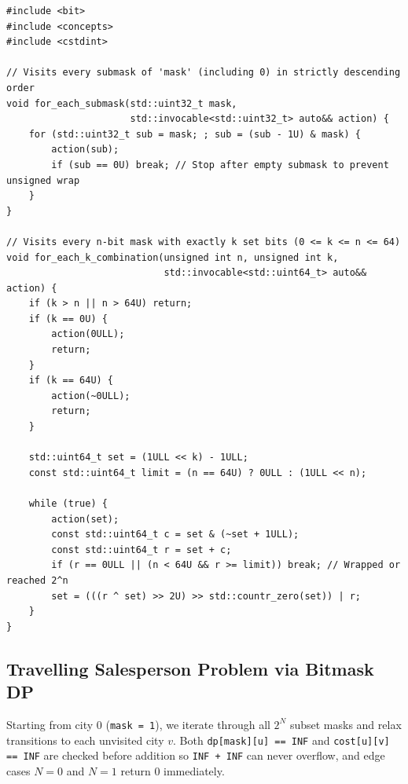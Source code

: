\documentclass[11pt,a4paper]{article}
\theoremstyle{definition}
\begin{document}
\begin{lstlisting}[caption={Zero-overhead submask enumeration and 64-bit-safe Gosper's Hack}]
#include <bit>
#include <concepts>
#include <cstdint>

// Visits every submask of 'mask' (including 0) in strictly descending order
void for_each_submask(std::uint32_t mask,
                      std::invocable<std::uint32_t> auto&& action) {
    for (std::uint32_t sub = mask; ; sub = (sub - 1U) & mask) {
        action(sub);
        if (sub == 0U) break; // Stop after empty submask to prevent unsigned wrap
    }
}

// Visits every n-bit mask with exactly k set bits (0 <= k <= n <= 64)
void for_each_k_combination(unsigned int n, unsigned int k,
                            std::invocable<std::uint64_t> auto&& action) {
    if (k > n || n > 64U) return;
    if (k == 0U) {
        action(0ULL);
        return;
    }
    if (k == 64U) {
        action(~0ULL);
        return;
    }

    std::uint64_t set = (1ULL << k) - 1ULL;
    const std::uint64_t limit = (n == 64U) ? 0ULL : (1ULL << n);

    while (true) {
        action(set);
        const std::uint64_t c = set & (~set + 1ULL);
        const std::uint64_t r = set + c;
        if (r == 0ULL || (n < 64U && r >= limit)) break; // Wrapped or reached 2^n
        set = (((r ^ set) >> 2U) >> std::countr_zero(set)) | r;
    }
}
\end{lstlisting}

\subsection{Travelling Salesperson Problem via Bitmask DP}

Starting from city $0$ (\texttt{mask = 1}), we iterate through all $2^N$ subset masks and relax transitions to each unvisited city $v$. Both \texttt{dp[mask][u] == INF} and \texttt{cost[u][v] == INF} are checked before addition so \texttt{INF + INF} can never overflow, and edge cases $N = 0$ and $N = 1$ return $0$ immediately.
\end{document}
